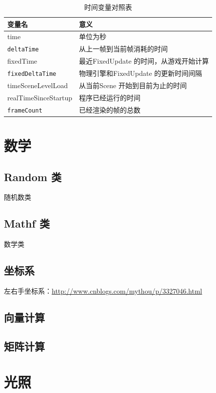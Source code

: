 \documentclass[UTF8,a4paper,12pt]{ctexbook}
\begin{document}
 		\begin{table}[H]
 			\centering
 			\caption{时间变量对照表}
 			\begin{tabular}{m{4cm}|m{10cm}}
 				\toprule
 					变量名 & 意义\\
 				\midrule
 					time & 单位为秒 \\
 					\verb|deltaTime|     & 从上一帧到当前帧消耗的时间 \\
 					fixedTime     & 最近FixedUpdate 的时间，从游戏开始计算 \\
 					\verb|fixedDeltaTime|     & 物理引擎和FixedUpdate 的更新时间间隔 \\
 					timeSceneLevelLoad     & 从当前Scene 开始到目前为止的时间 \\
 					realTimeSinceStartup     & 程序已经运行的时间 \\
 					\verb|frameCount|     & 已经渲染的帧的总数 \\
 				\bottomrule 
 			\end{tabular}
 		\end{table}
 		 		

\chapter{数学}
	\section{Random 类}
		随机数类
		
	\section{Mathf 类}
		数学类
	
	\section{坐标系}
		左右手坐标系：\url{http://www.cnblogs.com/mythou/p/3327046.html}
	
	\section{向量计算}
	
	
	\section{矩阵计算}
	
	
	
\chapter{光照}
\end{document}
